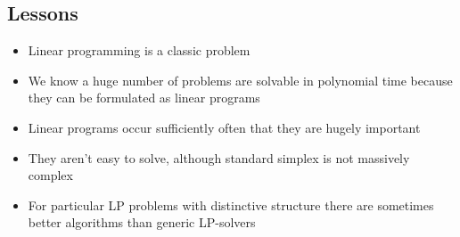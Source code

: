 
\begin{slide}
\section{Lessons}

\begin{PauseHighLight}
  \begin{itemize}
  \item Linear programming is a classic problem\pause
  \item We know a huge number of problems are solvable in polynomial
    time because they can be formulated as linear programs\pause
  \item Linear programs occur sufficiently often that they are hugely
    important\pause
  \item They aren't easy to solve, although standard simplex is not
    massively complex\pause
  \item For particular LP problems with distinctive structure there are
    sometimes better algorithms than generic LP-solvers\pause
  \end{itemize}
\end{PauseHighLight}

\end{slide}

